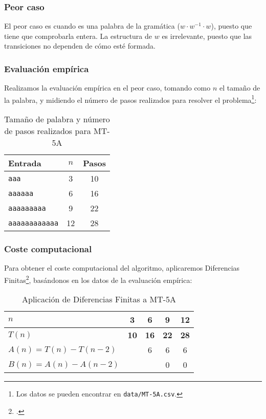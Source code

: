 

\subsubsection*{Peor caso}
El peor caso es cuando es una palabra de la gramática ($w \cdot w^{-1} \cdot w$), puesto que tiene que comprobarla entera. La estructura de $w$ es irrelevante, puesto que las transiciones no dependen de cómo esté formada.

\subsubsection*{Evaluación empírica}
Realizamos la evaluación empírica en el peor caso, tomando como $n$ el tamaño de la palabra, y midiendo el número de pasos realizados para resolver el problema\footnote{Los datos se pueden encontrar en \texttt{data/MT-5A.csv}.}:

\begin{table}[h]
    \centering
    \begin{tabular}{lcc}
        Entrada & $n$ & Pasos \\
        \hline
        \texttt{aaa}                &  3  & 10 \\
        \texttt{aaaaaa}             &  6  & 16 \\
        \texttt{aaaaaaaaa}          &  9  & 22 \\
        \texttt{aaaaaaaaaaaa}       & 12  & 28 \\
    \end{tabular}
    \caption{Tamaño de palabra y número de pasos realizados para MT-5A}
\end{table}


\subsubsection*{Coste computacional}
Para obtener el coste computacional del algoritmo, aplicaremos Diferencias Finitas\footcite[ver][pgs. 1-42: \textit{Chapter 1. Difference Tables and Polynomial Fits}]{cuoco2005mathematical}, basándonos en los datos de la evaluación empírica:

\begin{table}[H]
    \centering
    \begin{tabular}{|l|c|c|c|c|}
        \hline
        $n$    & \textbf{3}  & \textbf{6}  & \textbf{9}  & \textbf{12} \\ \hline
        $T(n)$ & \textbf{10} & \textbf{16} & \textbf{22} & \textbf{28} \\ \hline
        \hline
        $A(n) = T(n) - T(n-2)$ &   & 6 & 6 & 6 \\ \hline
        $B(n) = A(n) - A(n-2)$ &   &   & 0 & 0 \\ \hline
    \end{tabular}
    \label{tab:5A}
    \caption{Aplicación de Diferencias Finitas a MT-5A}
\end{table}

